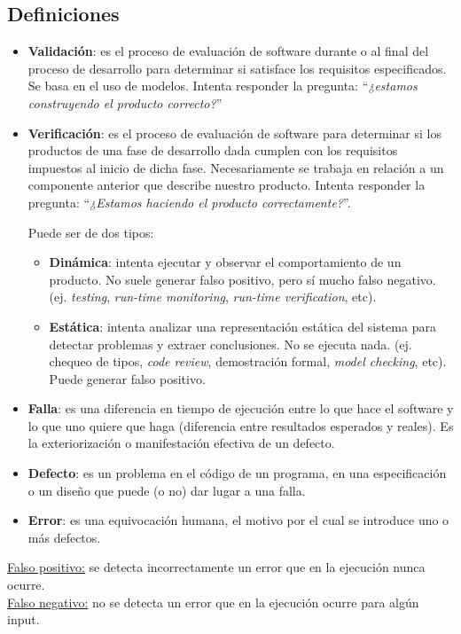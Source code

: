 \documentclass[]{article}
\begin{document}
\subsection{Definiciones}
\begin{itemize}
	\item \textbf{Validación}: es el proceso de evaluación de software durante o al final del proceso de desarrollo para determinar si satisface los requisitos especificados. Se basa en el uso de modelos. Intenta responder la pregunta: ``\textit{¿estamos construyendo el producto correcto?}''
	\item \textbf{Verificación}: es el proceso de evaluación de software para determinar si los productos de una fase de desarrollo dada cumplen con los requisitos impuestos al inicio de dicha fase. Necesariamente se trabaja en relación a un componente anterior que describe nuestro producto. Intenta responder la pregunta: ``\textit{¿Estamos haciendo el producto correctamente?}''.

Puede ser de dos tipos:
	\begin{itemize}
		\item \textbf{Dinámica}: intenta ejecutar y observar el comportamiento de un producto. No suele generar falso positivo, pero sí mucho falso negativo. (ej. \textit{testing}, \textit{run-time monitoring}, \textit{run-time verification}, etc).
		\item \textbf{Estática}: intenta analizar una representación estática del sistema para detectar problemas y extraer conclusiones. No se ejecuta nada. (ej. chequeo de tipos, \textit{code review}, demostración formal, \textit{model checking}, etc). Puede generar falso positivo.
	\end{itemize}
	\item \textbf{Falla}: es una diferencia en tiempo de ejecución entre lo que hace el software y lo que uno quiere que haga (diferencia entre resultados esperados y reales). Es la exteriorización o manifestación efectiva de un defecto.
	\item \textbf{Defecto}: es un problema en el código de un programa, en una especificación o un diseño que puede (o no) dar lugar a una falla.
	\item \textbf{Error}: es una equivocación humana, el motivo por el cual se introduce uno o más defectos.
\end{itemize}

\underline{Falso positivo:} se detecta incorrectamente un error que en la ejecución nunca ocurre.\\
\underline{Falso negativo:} no se detecta un error que en la ejecución ocurre para algún input.
\end{document}

